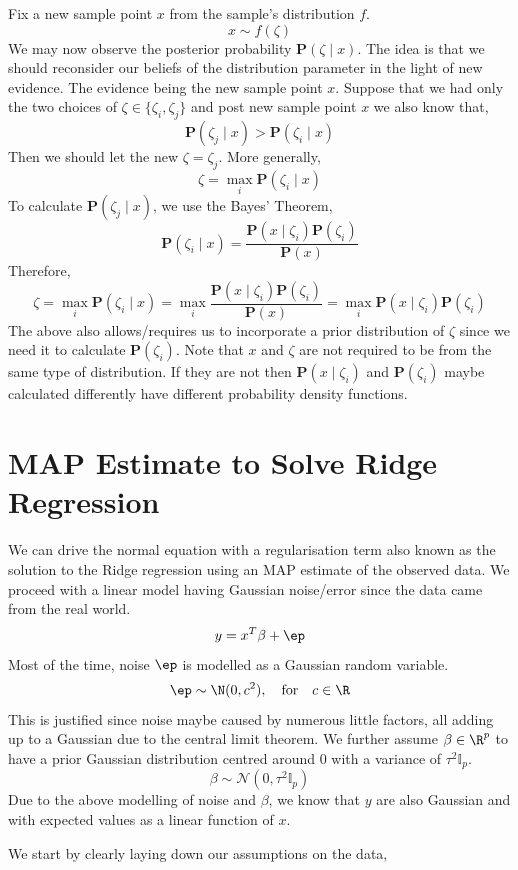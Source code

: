 \documentclass{homework}
\renewcommand\P{\mathbf{P}}
\begin{document}
Fix a new sample point $x$ from the sample's distribution $f$. 
\[
    x \sim f(\zeta)
\]
We may now observe the posterior probability $\P(\zeta \mid x)$. The idea is that we should reconsider our beliefs of the distribution parameter in the light of new evidence. The evidence being the new sample point $x$. Suppose that we had only the two choices of $\zeta \in \{\zeta_i, \zeta_j\}$ and post new sample point $x$ we also know that,
\[
    \P(\zeta_j \mid x) >  \P(\zeta_i \mid x)
\]
Then we should let the new $\zeta = \zeta_j$. More generally,
\[
    \zeta = \max_i \P(\zeta_i \mid x)
\]
To calculate $\P(\zeta_j \mid x)$, we use the Bayes' Theorem,
\[
    \P(\zeta_i \mid x) = \frac{\P(x \mid \zeta_i)\P(\zeta_i)}{\P(x)}
\]
Therefore,
\[
    \zeta = \max_i \P(\zeta_i \mid x) = \max_i \frac{\P(x \mid \zeta_i)\P(\zeta_i)}{\P(x)} = \max_i \P(x \mid \zeta_i)\P(\zeta_i)
\]
The above also allows/requires us to incorporate a prior distribution of $\zeta$ since we need it to calculate $\P(\zeta_i)$. Note that $x$ and $\zeta$ are not required to be from the same type of distribution.  If they are not then $\P(x \mid \zeta_i)$ and $\P(\zeta_i)$ maybe calculated differently \eg have different probability density functions.

\section{MAP Estimate to Solve Ridge Regression}


We can drive the normal equation with a regularisation term also known as the solution to the Ridge regression using an MAP estimate of the observed data. We proceed with a linear model having Gaussian noise/error since the data came from the real world.
\[
    y = x^T\beta+\ep
\]
Most of the time, noise $\ep$ is modelled as a Gaussian random variable.
\[
    \ep\sim\N(0, c^2), \quad \text{for} \quad c \in \R
\]
This is justified since noise maybe caused by numerous little factors, all adding up to a Gaussian due to the central limit theorem. We further assume $\beta\in\R^p$ to have a prior Gaussian distribution centred around 0 with a variance of $\tau^2\mathbb{I}_p$.
\[
    \beta \sim \mathcal{N}(0, \tau^2\mathbb{I}_p)
\]
Due to the above modelling of noise and $\beta$, we know that $y$ are also Gaussian and with expected values as a linear function of $x$.

We start by clearly laying down our assumptions on the data,
\end{document}

